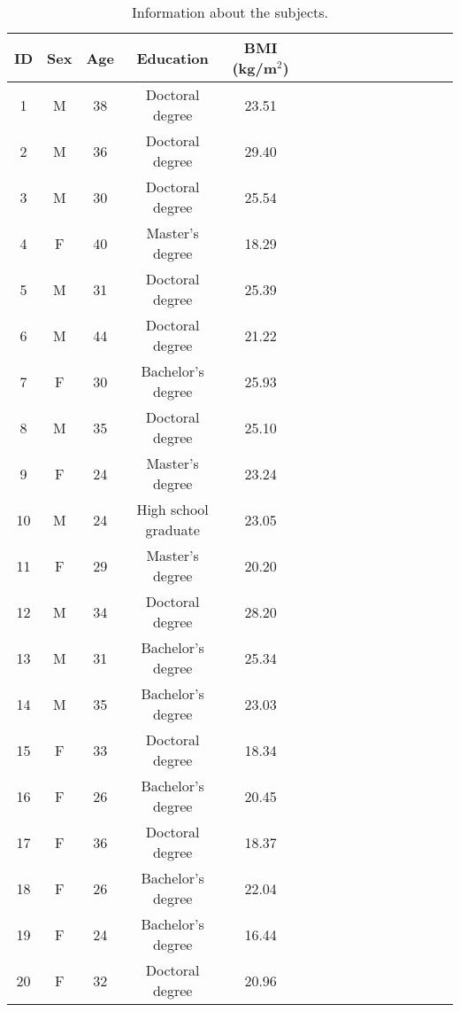 \begin{table}[h!]
\centering
\caption{Information about the subjects.}
\label{tab:subject_info}
\small \begin{tabular}{cccccccccccccccc}
\toprule
 ID & Sex &  Age &            Education &  BMI (kg/m$^{2}$) \\
\midrule
  1 &   M &   38 &      Doctoral degree &             23.51 \\
  2 &   M &   36 &      Doctoral degree &             29.40 \\
  3 &   M &   30 &      Doctoral degree &             25.54 \\
  4 &   F &   40 &      Master's degree &             18.29 \\
  5 &   M &   31 &      Doctoral degree &             25.39 \\
  6 &   M &   44 &      Doctoral degree &             21.22 \\
  7 &   F &   30 &    Bachelor's degree &             25.93 \\
  8 &   M &   35 &      Doctoral degree &             25.10 \\
  9 &   F &   24 &      Master's degree &             23.24 \\
 10 &   M &   24 & High school graduate &             23.05 \\
 11 &   F &   29 &      Master's degree &             20.20 \\
 12 &   M &   34 &      Doctoral degree &             28.20 \\
 13 &   M &   31 &    Bachelor's degree &             25.34 \\
 14 &   M &   35 &    Bachelor's degree &             23.03 \\
 15 &   F &   33 &      Doctoral degree &             18.34 \\
 16 &   F &   26 &    Bachelor's degree &             20.45 \\
 17 &   F &   36 &      Doctoral degree &             18.37 \\
 18 &   F &   26 &    Bachelor's degree &             22.04 \\
 19 &   F &   24 &    Bachelor's degree &             16.44 \\
 20 &   F &   32 &      Doctoral degree &             20.96 \\
\bottomrule
\end{tabular}
\end{table}
